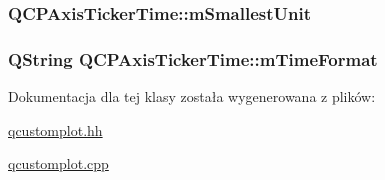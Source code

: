\subsubsection[{\texorpdfstring{m\+Smallest\+Unit}{mSmallestUnit}}]{ Q\+C\+P\+Axis\+Ticker\+Time\+::m\+Smallest\+Unit\hspace{0.3cm}{\ttfamily [protected]}}\hypertarget{class_q_c_p_axis_ticker_time_a61033c493cec76a69628d1aaa5b07abf}{}\label{class_q_c_p_axis_ticker_time_a61033c493cec76a69628d1aaa5b07abf}
\subsubsection[{\texorpdfstring{m\+Time\+Format}{mTimeFormat}}]{\setlength{\rightskip}{0pt plus 5cm}Q\+String Q\+C\+P\+Axis\+Ticker\+Time\+::m\+Time\+Format\hspace{0.3cm}{\ttfamily [protected]}}\hypertarget{class_q_c_p_axis_ticker_time_a800af3fe0a7c1a8110c043b82169bc9d}{}\label{class_q_c_p_axis_ticker_time_a800af3fe0a7c1a8110c043b82169bc9d}


Dokumentacja dla tej klasy została wygenerowana z plików\+:\begin{DoxyCompactItemize}
\item 
\hyperlink{qcustomplot_8hh}{qcustomplot.\+hh}\item 
\hyperlink{qcustomplot_8cpp}{qcustomplot.\+cpp}\end{DoxyCompactItemize}
